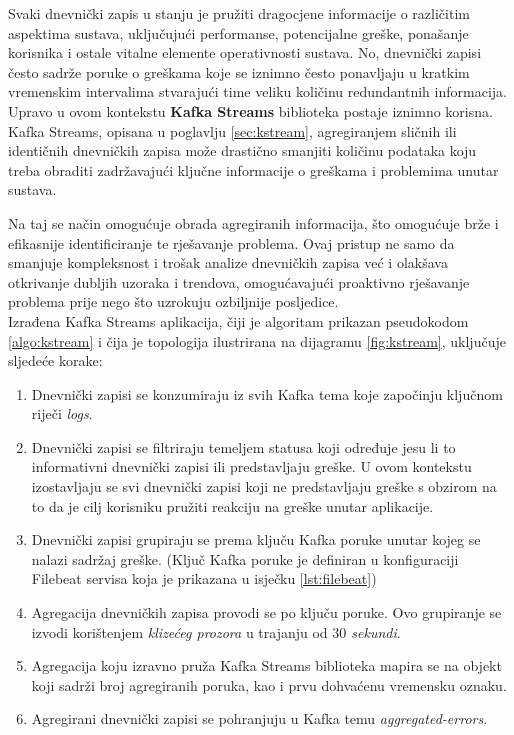 \documentclass[times, utf8, diplomski]{fer}
\begin{document}
Svaki dnevnički zapis u stanju je pružiti dragocjene informacije o različitim aspektima sustava, uključujući performanse, potencijalne greške, ponašanje korisnika i ostale vitalne elemente operativnosti sustava. No, dnevnički zapisi često sadrže poruke o greškama koje se iznimno često ponavljaju u kratkim vremenskim intervalima stvarajući time veliku količinu redundantnih informacija.\\

Upravo u ovom kontekstu \textbf{Kafka Streams} biblioteka postaje iznimno korisna. Kafka Streams, opisana u poglavlju \ref{sec:kstream}, agregiranjem sličnih ili identičnih dnevničkih zapisa može drastično smanjiti količinu podataka koju treba obraditi zadržavajući ključne informacije o greškama i problemima unutar sustava.

Na taj se način omogućuje obrada agregiranih informacija, što omogućuje brže i efikasnije identificiranje te rješavanje problema. Ovaj pristup ne samo da smanjuje kompleksnost i trošak analize dnevničkih zapisa već i olakšava otkrivanje dubljih uzoraka i trendova, omogućavajući proaktivno rješavanje problema prije nego što uzrokuju ozbiljnije posljedice.\\

Izrađena Kafka Streams aplikacija, čiji je algoritam prikazan pseudokodom \ref{algo:kstream} i čija je topologija ilustrirana na dijagramu \ref{fig:kstream}, uključuje sljedeće korake:

\begin{enumerate}
	\item Dnevnički zapisi se konzumiraju iz svih Kafka tema koje započinju ključnom riječi \emph{\glqq logs\grqq}.
	\item Dnevnički zapisi se filtriraju temeljem statusa koji određuje jesu li to informativni dnevnički zapisi ili predstavljaju greške. U ovom kontekstu izostavljaju se svi dnevnički zapisi koji ne predstavljaju greške s obzirom na to da je cilj korisniku pružiti reakciju na greške unutar aplikacije.
	\item Dnevnički zapisi grupiraju se prema ključu Kafka poruke unutar kojeg se nalazi sadržaj greške. (Ključ Kafka poruke je definiran u konfiguraciji Filebeat servisa koja je prikazana u isječku \ref{lst:filebeat})
	\item Agregacija dnevničkih zapisa provodi se po ključu poruke. Ovo grupiranje se izvodi korištenjem \emph{klizećeg prozora} u trajanju od \emph{$30$ sekundi}.
	\item Agregacija koju izravno pruža Kafka Streams biblioteka mapira se na objekt koji sadrži broj agregiranih poruka, kao i prvu dohvaćenu vremensku oznaku.
	\item Agregirani dnevnički zapisi se pohranjuju u Kafka temu \emph{\glqq aggregated-errors\grqq}.
\end{enumerate}
\end{document}
